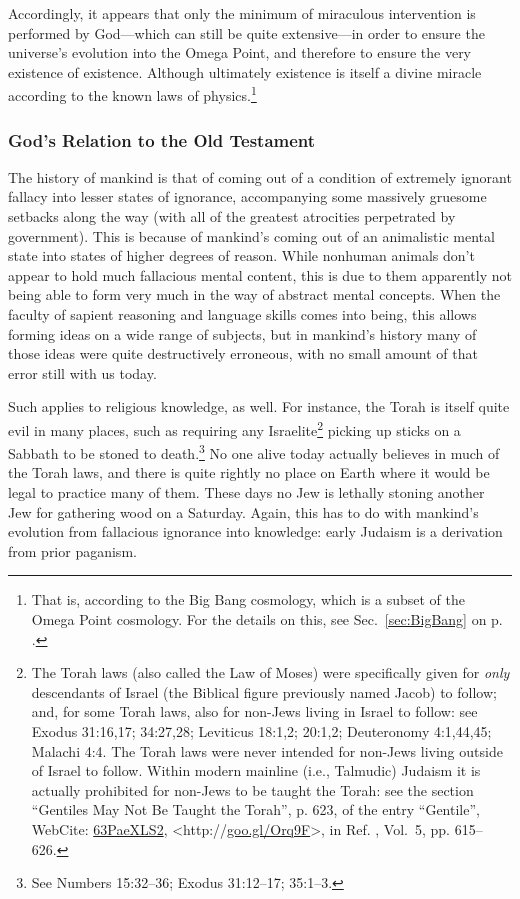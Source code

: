 \documentclass[letterpaper,12pt]{article}
\newcommand{\dsc}{\discretionary{}{}{}}
\begin{document}
Accordingly, it appears that only the minimum of miraculous intervention is performed by God---which can still be quite extensive---in order to ensure the universe's evolution into the Omega Point, and therefore to ensure the very existence of existence. Although ultimately existence is itself a divine miracle according to the known laws of physics.\footnote{That is, according to the Big Bang cosmology, which is a subset of the Omega Point cosmology. For the details on this, see Sec.~\ref{sec:BigBang} on p. \pageref{sec:BigBang}.}

\subsubsection{God's Relation to the Old Testament}
\label{subsubsec:GodRelationOldTestament}

The history of mankind is that of coming out of a condition of extremely ignorant fallacy into lesser states of ignorance, accompanying some massively gruesome setbacks along the way (with all of the greatest atrocities perpetrated by government). This is because of mankind's coming out of an animalistic mental state into states of higher degrees of reason. While nonhuman animals don't appear to hold much fallacious mental content, this is due to them apparently not being able to form very much in the way of abstract mental concepts. When the faculty of sapient reasoning and language skills comes into being, this allows forming ideas on a wide range of subjects, but in mankind's history many of those ideas were quite destructively erroneous, with no small amount of that error still with us today.

Such applies to religious knowledge, as well. For instance, the Torah is itself quite evil in many places, such as requiring any Israelite\footnote{The Torah laws (also called the Law of Moses) were specifically given for \emph{only} descendants of Israel (the Biblical figure previously named Jacob) to follow; and, for some Torah laws, also for non-Jews living in Israel to follow: see Exodus 31:16,17; 34:27,28; Leviticus 18:1,2; 20:1,2; Deuteronomy 4:1,44,45; Malachi 4:4. The Torah laws were never intended for non-Jews living outside of Israel to follow. Within modern mainline (i.e., Talmudic) Judaism it is actually prohibited for non-Jews to be taught the Torah: see the section ``Gentiles May Not Be Taught the Torah'', p. 623, of the entry ``Gentile'', WebCite: \href{http://www.webcitation.org/63PaeXLS2}{63PaeXLS2}, \textless http://\dsc \href{http://goo.gl/Orq9F}{goo.gl/\dsc Orq9F}\textgreater , in Ref. , Vol.~5, pp. 615--626.} picking up sticks on a Sabbath to be stoned to death.\footnote{See Numbers 15:32--36; Exodus 31:12--17; 35:1--3.} No one alive today actually believes in much of the Torah laws, and there is quite rightly no place on Earth where it would be legal to practice many of them. These days no Jew is lethally stoning another Jew for gathering wood on a Saturday. Again, this has to do with mankind's evolution from fallacious ignorance into knowledge: early Judaism is a derivation from prior paganism.
\end{document}
